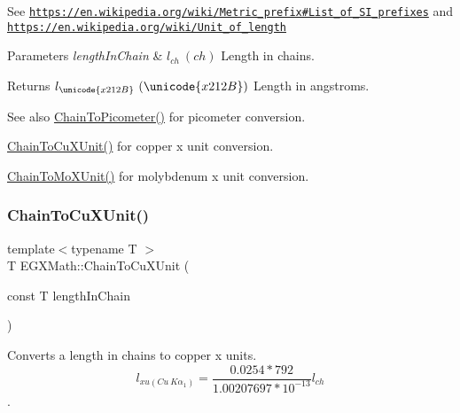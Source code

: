 See \href{https://en.wikipedia.org/wiki/Metric_prefix#List_of_SI_prefixes}{\tt https\+://en.\+wikipedia.\+org/wiki/\+Metric\+\_\+prefix\#\+List\+\_\+of\+\_\+\+S\+I\+\_\+prefixes} and \href{https://en.wikipedia.org/wiki/Unit_of_length}{\tt https\+://en.\+wikipedia.\+org/wiki/\+Unit\+\_\+of\+\_\+length} 
\begin{DoxyParams}{Parameters}
{\em length\+In\+Chain} & $ l_{ch}\ (ch)$ Length in chains. \\
\hline
\end{DoxyParams}
\begin{DoxyReturn}{Returns}
$ l_{\unicode{x212B}}\ (\unicode{x212B})$ Length in angstroms. 
\end{DoxyReturn}
\begin{DoxySeeAlso}{See also}
\mbox{\hyperlink{group___e_g_x_math-_conversions-_length_conversions-_surveyors-_chain-_s_i_ga27f06f3f63727a16e02afaf8f01f4b45}{Chain\+To\+Picometer()}} for picometer conversion. 

\mbox{\hyperlink{group___e_g_x_math-_conversions-_length_conversions-_surveyors-_chain-_non-_s_i_ga4d49e29ef32b64b7a433ffe76447cf5f}{Chain\+To\+Cu\+X\+Unit()}} for copper x unit conversion. 

\mbox{\hyperlink{group___e_g_x_math-_conversions-_length_conversions-_surveyors-_chain-_non-_s_i_gae4a2b99d846db53416e9fc5d6f9e957c}{Chain\+To\+Mo\+X\+Unit()}} for molybdenum x unit conversion. 
\end{DoxySeeAlso}
\mbox{\label{group___e_g_x_math-_conversions-_length_conversions-_surveyors-_chain-_non-_s_i_ga4d49e29ef32b64b7a433ffe76447cf5f}} 
\subsubsection{\texorpdfstring{Chain\+To\+Cu\+X\+Unit()}{ChainToCuXUnit()}}
{\footnotesize\ttfamily template$<$typename T $>$ \\
T E\+G\+X\+Math\+::\+Chain\+To\+Cu\+X\+Unit (\begin{DoxyParamCaption}\item[{const T}]{length\+In\+Chain }\end{DoxyParamCaption})}



Converts a length in chains to copper x units. \[ l_{xu(Cu\ K\alpha_1)}=\frac{0.0254 * 792}{1.00207697*10^{-13}} l_{ch}\]. 


